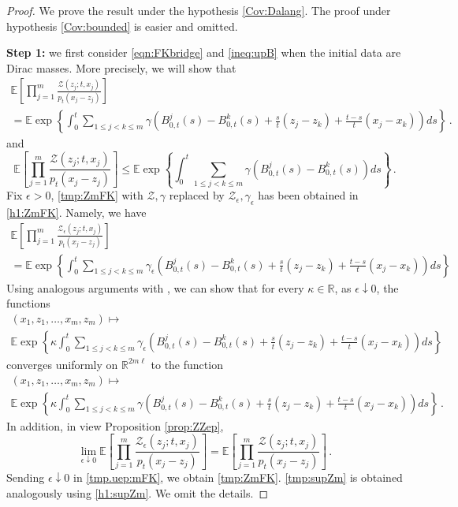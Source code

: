 \documentclass[12pt,reqno]{amsart}
\theoremstyle{remark}
\newcommand{\1}{\mathbf{1}}
\def\RR{\mathbb{R}}
\def\EE{\mathbb{E}}
\def\Z{\mathcal{Z}}
\def\lt{\left}
\def\rt{\right}
\begin{document}
	\begin{proof} We prove the result under the hypothesis \ref{Cov:Dalang}. The proof under hypothesis \ref{Cov:bounded} is easier and omitted. 

		\textbf{Step 1:} we first consider \eqref{eqn:FKbridge} and \eqref{ineq:upB} when the initial data are Dirac masses. More precisely, we will show that
		\begin{multline}\label{tmp:ZmFK}
			\EE\left[\prod_{j=1}^m \frac{\Z(z_j;t,x_j)}{p_t(x_j-z_j)} \right]
			\\=  
			\EE\exp\left\{\int_0^t\sum_{1\le j<k\le m} \gamma\left(B_{0,t}^j(s)-B_{0,t}^k(s)+\frac st(z_j-z_k) +\frac{t-s}t(x_j-x_k)\right)ds\right\}\,.
		\end{multline}
		and
		\begin{equation}\label{tmp:supZm}
			\EE\left[\prod_{j=1}^m \frac{\Z(z_j;t,x_j)}{p_t(x_j-z_j)} \right]
			\le  
			\EE\exp\left\{\int_0^t\sum_{1\le j<k\le m} \gamma\left(B_{0,t}^j(s)-B_{0,t}^k(s)\right)ds\right\}\,.
		\end{equation}
		Fix $\epsilon>0$, \eqref{tmp:ZmFK} with $\Z,\gamma$ replaced by $\Z_\epsilon,\gamma_\epsilon$ has been obtained in \eqref{h1:ZmFK}. Namely, we have
		\begin{multline}\label{tmp.uep:mFK}
			\EE\left[\prod_{j=1}^m \frac{\Z_ \epsilon(z_j;t,x_j)}{p_t(x_j-z_j)} \right]
			\\=  
			\EE\exp\left\{\int_0^t\sum_{1\le j<k\le m} \gamma_ \epsilon\left(B_{0,t}^j(s)-B_{0,t}^k(s)+\frac st(z_j-z_k) +\frac{t-s}t(x_j-x_k)\right)ds\right\}
		\end{multline}
		Using analogous arguments with \cite[Proposition 4.2]{HLN15}, we can show that for every $\kappa\in\RR$, as $\epsilon\downarrow0$, the functions
		\begin{multline*}
			(x_1,z_1,\dots,x_m,z_m)\mapsto
			\\\EE\exp\lt\{\kappa\int_0^t \sum_{1\le j<k\le m}\gamma_ \epsilon\left(B_{0,t}^j(s)-B_{0,t}^k(s)+\frac st(z_j-z_k) +\frac{t-s}t(x_j-x_k)\right)ds \rt\}
		\end{multline*}
		converges uniformly on $\RR^{2m\ell}$ to the function
		\begin{multline*}
			(x_1,z_1,\dots,x_m,z_m)\mapsto
			\\\EE\exp\lt\{\kappa\int_0^t \sum_{1\le j<k\le m}\gamma\left(B_{0,t}^j(s)-B_{0,t}^k(s)+\frac st(z_j-z_k) +\frac{t-s}t(x_j-x_k)\right)ds \rt\}\,.
		\end{multline*}
		In addition, in view Proposition \ref{prop:ZZep}, 
		\begin{equation*}
			\lim_{\epsilon\downarrow0}\EE\left[\prod_{j=1}^m \frac{\Z_ \epsilon(z_j;t,x_j)}{p_t(x_j-z_j)} \right]=\EE\left[\prod_{j=1}^m \frac{\Z(z_j;t,x_j)}{p_t(x_j-z_j)} \right]\,.
		\end{equation*}
		Sending $\epsilon\downarrow0$ in \eqref{tmp.uep:mFK}, we obtain \eqref{tmp:ZmFK}. \eqref{tmp:supZm} is obtained analogously using \eqref{h1:supZm}. We omit the details.


\end{proof}
\end{document}
